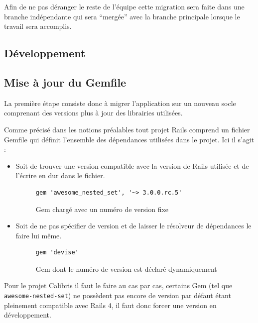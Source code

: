 \documentclass[12pt,a4paper]{book}
\begin{document}
Afin de ne pas déranger le reste de l'équipe cette migration sera faite dans une branche indépendante qui sera ``mergée'' avec la branche principale lorsque le travail sera accomplis.

\subsection{Développement}

\subsection{Mise à jour du Gemfile}

La première étape consiste donc à migrer l'application sur un nouveau socle comprenant des versions plus à jour des librairies utilisées.

Comme précisé dans les notions préalables tout projet Rails comprend un fichier Gemfile qui définit l'ensemble des dépendances utilisées dans le projet. Ici il s'agit :
\begin{itemize}
  \item Soit de trouver une version compatible avec la version de Rails utilisée et de l'écrire en dur dans le fichier.
  
    \begin{figure}[h]
    \lstset{language=ruby}
    \begin{lstlisting}
gem 'awesome_nested_set', '~> 3.0.0.rc.5'
    \end{lstlisting}
     \caption{Gem chargé avec un numéro de version fixe}
    \end{figure}
    
  \item Soit de ne pas spécifier de version et de laisser le résolveur de dépendances le faire lui même.
  
    \begin{figure}[h]
    \lstset{language=ruby}
    \begin{lstlisting}
gem 'devise'
    \end{lstlisting}
     \caption{Gem dont le numéro de version est déclaré dynamiquement}
    \end{figure}
\end{itemize}

Pour le projet Calibris il faut le faire au cas par cas, certains Gem (tel que \texttt{awesome-nested-set}) ne possèdent pas encore de version par défaut étant pleinement compatible avec Rails 4, il faut donc forcer une version en développement.
\end{document}
